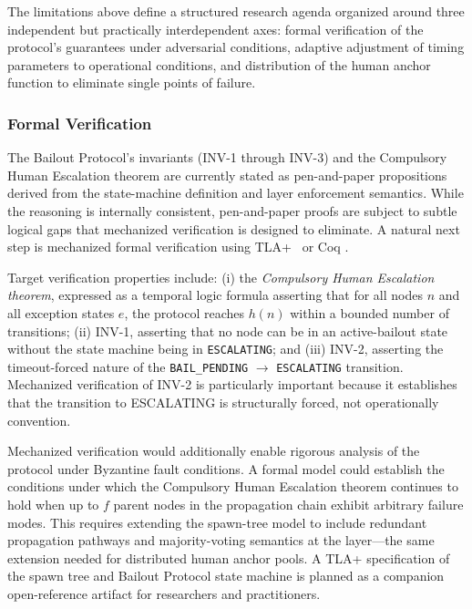The limitations above define a structured research agenda organized around three independent but practically interdependent axes: formal verification of the protocol's guarantees under adversarial conditions, adaptive adjustment of timing parameters to operational conditions, and distribution of the human anchor function to eliminate single points of failure.

\subsubsection{Formal Verification}
\label{sec:fw:verification}

The Bailout Protocol's invariants (INV-1 through INV-3) and the Compulsory Human Escalation theorem are currently stated as pen-and-paper propositions derived from the state-machine definition and \fact{} layer enforcement semantics. While the reasoning is internally consistent, pen-and-paper proofs are subject to subtle logical gaps that mechanized verification is designed to eliminate. A natural next step is mechanized formal verification using TLA+\ \cite{lamport2019tlaplus} or Coq \cite{coq2024}.

Target verification properties include: (i) the \textit{Compulsory Human Escalation theorem}, expressed as a temporal logic formula asserting that for all nodes $n$ and all exception states $e$, the protocol reaches $h(n)$ within a bounded number of transitions; (ii) INV-1, asserting that no node can be in an active-bailout state without the state machine being in \texttt{ESCALATING}; and (iii) INV-2, asserting the timeout-forced nature of the \texttt{BAIL\_PENDING} $\rightarrow$ \texttt{ESCALATING} transition. Mechanized verification of INV-2 is particularly important because it establishes that the transition to ESCALATING is structurally forced, not operationally convention.

Mechanized verification would additionally enable rigorous analysis of the protocol under Byzantine fault conditions. A formal model could establish the conditions under which the Compulsory Human Escalation theorem continues to hold when up to $f$ parent nodes in the propagation chain exhibit arbitrary failure modes. This requires extending the spawn-tree model to include redundant propagation pathways and majority-voting semantics at the \fact{} layer---the same extension needed for distributed human anchor pools. A TLA+ specification of the \bxthree{} spawn tree and Bailout Protocol state machine is planned as a companion open-reference artifact for researchers and practitioners.

